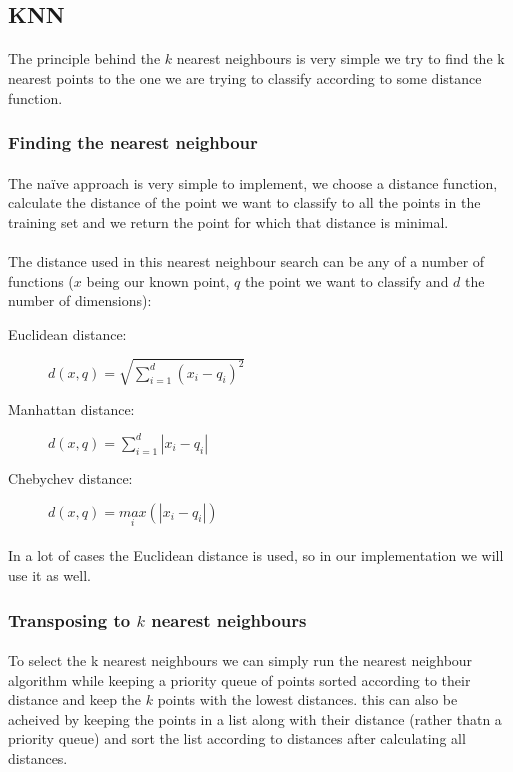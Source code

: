 \documentclass[11 pt]{article}
\begin{document}
\subsection{KNN}
\paragraph{}The principle behind the $k$ nearest neighbours is very simple we try to find the k nearest points to the one we are trying to classify according to some distance function.
\subsubsection{Finding the nearest neighbour}
\paragraph{}The na\"ive approach is very simple to implement, we choose a distance function, calculate the distance of the point we want to classify to all the points in the training set and we return the point for which that distance is minimal.
\paragraph{}The distance used in this nearest neighbour search can be any of a number of functions ($x$ being our known point, $q$ the point we want to classify and $d$ the number of dimensions):
\begin{description}
  \item[Euclidean distance: ]$d(x,q)=\sqrt{\sum^d_{i=1}(x_i-q_i)^2}$
  \item[Manhattan distance: ]$d(x,q)=\sum^d_{i=1}|x_i-q_i|$
  \item[Chebychev distance: ]$d(x,q)=\underset{i}{max}(|x_i-q_i|)$
\end{description}
\paragraph{}In a lot of cases the Euclidean distance is used, so in our implementation we will use it as well.
\subsubsection{Transposing to $k$ nearest neighbours}
\paragraph{}To select the k nearest neighbours we can simply run the nearest neighbour algorithm while keeping a priority queue of points sorted according to their distance and keep the $k$ points with the lowest distances. this can also be acheived by keeping the points in a list along with their distance (rather thatn a priority queue) and sort the list according to distances after calculating all distances.
\end{document}
